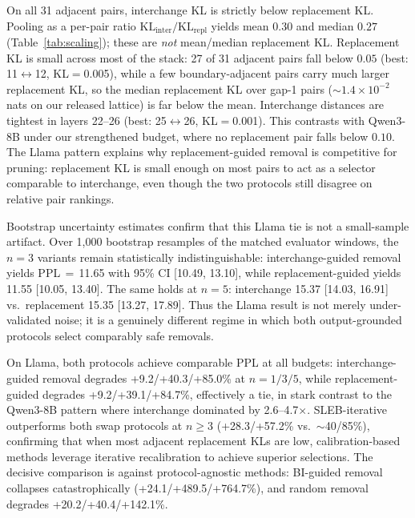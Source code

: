 \documentclass{article}
\begin{document}
On all 31 adjacent pairs, interchange KL is strictly below replacement KL. Pooling as a per-pair ratio $\mathrm{KL}_{\mathrm{inter}}/\mathrm{KL}_{\mathrm{repl}}$ yields mean $0.30$ and median $0.27$ (Table~\ref{tab:scaling}); these are \emph{not} mean/median replacement KL. Replacement KL is small across most of the stack: 27 of 31 adjacent pairs fall below $0.05$ (best: 11$\leftrightarrow$12, KL$=$0.005), while a few boundary-adjacent pairs carry much larger replacement KL, so the median replacement KL over gap-1 pairs (${\sim}1.4{\times}10^{-2}$ nats on our released lattice) is far below the mean. Interchange distances are tightest in layers 22--26 (best: 25$\leftrightarrow$26, KL$=$0.001). This contrasts with Qwen3-8B under our strengthened budget, where no replacement pair falls below $0.10$. The Llama pattern explains why replacement-guided removal is competitive for pruning: replacement KL is small enough on most pairs to act as a selector comparable to interchange, even though the two protocols still disagree on relative pair rankings.

Bootstrap uncertainty estimates confirm that this Llama tie is not a small-sample artifact. Over 1{,}000 bootstrap resamples of the matched evaluator windows, the $n{=}3$ variants remain statistically indistinguishable: interchange-guided removal yields PPL\,$=$\,11.65 with 95\% CI [10.49, 13.10], while replacement-guided yields 11.55 [10.05, 13.40]. The same holds at $n{=}5$: interchange 15.37 [14.03, 16.91] vs.\ replacement 15.35 [13.27, 17.89]. Thus the Llama result is not merely under-validated noise; it is a genuinely different regime in which both output-grounded protocols select comparably safe removals.

On Llama, both protocols achieve comparable PPL at all budgets: interchange-guided removal degrades +9.2/+40.3/+85.0\% at $n{=}1/3/5$, while replacement-guided degrades +9.2/+39.1/+84.7\%, effectively a tie, in stark contrast to the Qwen3-8B pattern where interchange dominated by 2.6--4.7$\times$. SLEB-iterative outperforms both swap protocols at $n{\geq}3$ (+28.3/+57.2\% vs.\ ${\sim}$40/85\%), confirming that when most adjacent replacement KLs are low, calibration-based methods leverage iterative recalibration to achieve superior selections. The decisive comparison is against protocol-agnostic methods: BI-guided removal collapses catastrophically (+24.1/+489.5/+764.7\%), and random removal degrades +20.2/+40.4/+142.1\%.
\end{document}
